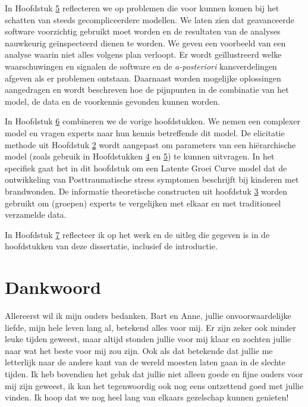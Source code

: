 \documentclass[openright,titlepage,12pt,a4paper]{book}
\begin{document}
In Hoofdstuk \protect\hyperlink{Burns}{5} reflecteren we op problemen die voor kunnen komen bij het schatten van steeds gecompliceerdere modellen. We laten zien dat geavanceerde software voorzichtig gebruikt moet worden en de resultaten van de analyses nauwkeurig geïnspecteerd dienen te worden. We geven een voorbeeld van een analyse waarin niet alles volgens plan verloopt. Er wordt geïllustreerd welke waarschuwingen en signalen de software en de \emph{a-posteriori} kansverdelingen afgeven als er problemen ontstaan. Daarnaast worden mogelijke oplossingen aangedragen en wordt beschreven hoe de pijnpunten in de combinatie van het model, de data en de voorkennis gevonden kunnen worden.

In Hoofdstuk \protect\hyperlink{elicitlgm}{6} combineren we de vorige hoofdstukken. We nemen een complexer model en vragen experts naar hun kennis betreffende dit model. De elicitatie methode uit Hoofdstuk \protect\hyperlink{fivestep}{2} wordt aangepast om parameters van een hiërarchische model (zoals gebruik in Hoofdstukken \protect\hyperlink{Hierarchical}{4} en \protect\hyperlink{Burns}{5}) te kunnen uitvragen. In het specifiek gaat het in dit hoofdstuk om een Latente Groei Curve model dat de ontwikkeling van Posttraumatische stress symptomen beschrijft bij kinderen met brandwonden. De informatie theoretische constructen uit hoofdstuk \protect\hyperlink{DAC1}{3} worden gebruikt om (groepen) experts te vergelijken met elkaar en met traditioneel verzamelde data.

In Hoofdstuk \protect\hyperlink{thesisdiscussion}{7} reflecteer ik op het werk en de uitleg die gegeven is in de hoofdstukken van deze dissertatie, inclusief de introductie.

\hypertarget{dankwoord}{%
\chapter*{Dankwoord}\label{dankwoord}}

%

\thispagestyle{empty}

Allereerst wil ik mijn ouders bedanken. Bart en Anne, jullie onvoorwaardelijke liefde, mijn hele leven lang al, betekend alles voor mij. Er zijn zeker ook minder leuke tijden geweest, maar altijd stonden jullie voor mij klaar en zochten jullie naar wat het beste voor mij zou zijn. Ook als dat betekende dat jullie me letterlijk naar de andere kant van de wereld moesten laten gaan in de slechte tijden. Ik heb bovendien het geluk dat jullie niet alleen goede en fijne ouders voor mij zijn geweest, ik kan het tegenwoordig ook nog eens ontzettend goed met jullie vinden. Ik hoop dat we nog heel lang van elkaars gezelschap kunnen genieten!
\end{document}

